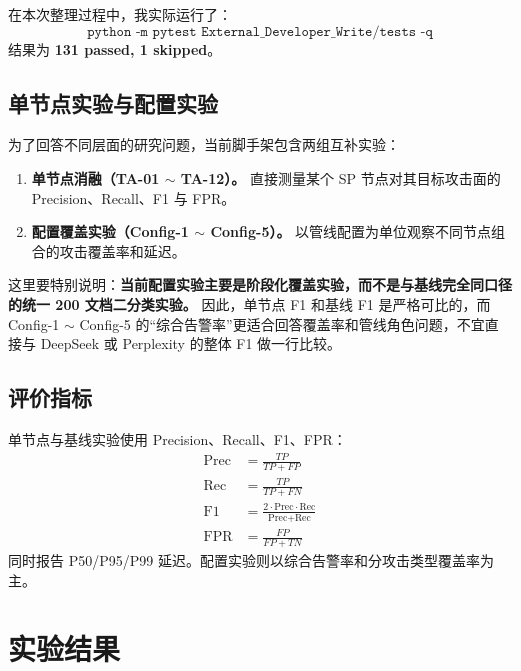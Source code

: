 \documentclass[11pt,a4paper]{ctexart}
\begin{document}
在本次整理过程中，我实际运行了：
\begin{equation}
\texttt{python -m pytest External\_Developer\_Write/tests -q}
\end{equation}
结果为 \textbf{131 passed, 1 skipped}。

\subsection{单节点实验与配置实验}
为了回答不同层面的研究问题，当前脚手架包含两组互补实验：
\begin{enumerate}[leftmargin=2em]
  \item \textbf{单节点消融（TA-01 $\sim$ TA-12）。} 直接测量某个 SP 节点对其目标攻击面的 Precision、Recall、F1 与 FPR。
  \item \textbf{配置覆盖实验（Config-1 $\sim$ Config-5）。} 以管线配置为单位观察不同节点组合的攻击覆盖率和延迟。
\end{enumerate}

这里要特别说明：\textbf{当前配置实验主要是阶段化覆盖实验，而不是与基线完全同口径的统一 200 文档二分类实验。} 因此，单节点 F1 和基线 F1 是严格可比的，而 Config-1 $\sim$ Config-5 的“综合告警率”更适合回答覆盖率和管线角色问题，不宜直接与 DeepSeek 或 Perplexity 的整体 F1 做一行比较。

\subsection{评价指标}
单节点与基线实验使用 Precision、Recall、F1、FPR：
\begin{align}
\text{Prec} &= \frac{TP}{TP+FP} \\
\text{Rec} &= \frac{TP}{TP+FN} \\
\text{F1} &= \frac{2\cdot \text{Prec}\cdot \text{Rec}}{\text{Prec}+\text{Rec}} \\
\text{FPR} &= \frac{FP}{FP+TN}
\end{align}
同时报告 P50/P95/P99 延迟。配置实验则以综合告警率和分攻击类型覆盖率为主。

\section{实验结果}
\end{document}
